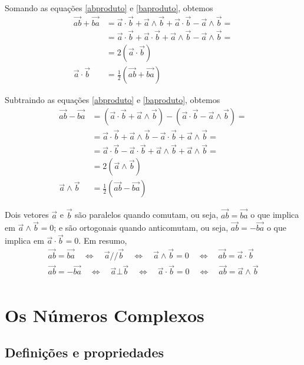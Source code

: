 \documentclass[12pt, oneside, a4paper, english, brazil]{abntex2}
\providecommand{\p}[1]{\left( #1 \right)}
\renewcommand{\vec}{\overrightarrow}
\theoremstyle{normal}
\theoremstyle{observacao}
\begin{document}
Somando as equações \ref{abproduto} e \ref{baproduto}, obtemos
\begin{align*}
\vec{ab} + \vec{ba} &= \vec{a} \cdot \vec{b} + \vec{a} \wedge \vec{b} + \vec{a} \cdot \vec{b} - \vec{a} \wedge \vec{b} = \\
&= \vec{a} \cdot \vec{b} + \vec{a} \cdot \vec{b} + \vec{a} \wedge \vec{b} - \vec{a} \wedge \vec{b} = \\
&= 2 \p{\vec{a} \cdot \vec{b}}\\
\vec{a} \cdot \vec{b} &= \frac{1}{2}\p{\vec{ab} + \vec{ba}}
\end{align*}

Subtraindo as equações \ref{abproduto} e \ref{baproduto}, obtemos
\begin{align*}
\vec{ab} - \vec{ba} &= \p{\vec{a} \cdot \vec{b} + \vec{a} \wedge \vec{b}} - \p{\vec{a} \cdot \vec{b} - \vec{a} \wedge \vec{b}}= \\
&= \vec{a} \cdot \vec{b} + \vec{a} \wedge \vec{b}-\vec{a} \cdot \vec{b} + \vec{a} \wedge \vec{b}= \\
&= \vec{a} \cdot \vec{b}-\vec{a} \cdot \vec{b} + \vec{a} \wedge \vec{b} + \vec{a} \wedge \vec{b}= \\
&= 2 \p{\vec{a} \wedge \vec{b}}\\
\vec{a} \wedge \vec{b} &= \frac{1}{2}\p{\vec{ab} - \vec{ba}}
\end{align*}


Dois vetores $\vec{a}$ e $\vec{b}$ são paralelos quando comutam, ou seja, $\vec{ab}=\vec{ba}$ o que implica em $\vec{a}\wedge\vec{b} = 0$; e são ortogonais quando anticomutam, ou seja, $\vec{ab}=-\vec{ba}$ o que implica em $\vec{a} \cdot \vec{b} = 0$. Em resumo,
\begin{align*}
\vec{ab} = \vec{ba} \quad \Longleftrightarrow \quad \vec{a} // \vec{b} \quad \Longleftrightarrow \quad \vec{a}\wedge\vec{b} = 0 \quad \Longleftrightarrow \quad \vec{ab} = \vec{a} \cdot \vec{b} \\
\vec{ab} = -\vec{ba} \quad \Longleftrightarrow \quad  \vec{a} \bot \vec{b} \quad \Longleftrightarrow \quad \vec{a} \cdot \vec{b} = 0 \quad \Longleftrightarrow \quad \vec{ab} =  \vec{a}\wedge\vec{b} \\
\end{align*}

\chapter{Os Números Complexos}\label{complexos}

\section{Definições e propriedades}
\end{document}
